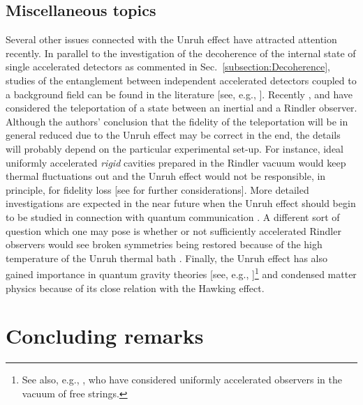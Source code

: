 \documentclass[12pt,nofootinbib,floatfix,aps,prd,showpacs,amsmath,amssymb,eqsecnum]{revtex4-2}
\let\cite\citep
\begin{document}
\subsection{Miscellaneous topics}
\label{subsection:Miscellaneous}

Several other issues connected with the Unruh effect have attracted 
attention recently. In parallel to the investigation of the 
decoherence of the internal state of single accelerated detectors 
as commented in Sec.~\ref{subsection:Decoherence}, studies of the 
entanglement between independent accelerated detectors coupled 
to a background field can  be found in the literature 
[see, e.g., \textcite{Pringle89,Benattital04,Rezniktal05, Massaretal06}]. 
Recently \textcite{Alsingetal03}, 
\textcite{Alsingetal04} and \textcite{Alsingetal06} 
have considered the teleportation of a state between an inertial and a 
Rindler observer. 
Although the authors' conclusion that the fidelity of the 
teleportation will be in general reduced due to the Unruh effect 
may be correct in the end, 
the details will probably depend 
on the particular experimental set-up. For instance, ideal uniformly 
accelerated {\em rigid} cavities prepared in the Rindler vacuum  would keep 
thermal fluctuations out \cite{Levinetal92} and the Unruh effect 
would not be responsible, in principle, for fidelity loss 
[see \textcite{Schutzholdetal05} for further considerations]. 
More detailed investigations are expected in the near future when
the Unruh effect should begin to be studied in connection with 
quantum communication \cite{Bradler07}. A different sort of question 
which one may pose is whether or not sufficiently accelerated Rindler 
observers would see broken symmetries being restored because of the 
high temperature of the Unruh thermal bath \cite{Hill85,Ohsaku04,Ebertetal07,Kharzeevetal05}. 
Finally, the Unruh effect has also gained importance in
quantum gravity theories [see, e.g., 
\textcite{Susskindetal94}]\footnote{See also, e.g., 
\textcite{Parentanietal89}, who have considered uniformly 
accelerated observers in the vacuum of free strings.}
and condensed matter physics \cite{Unruh81} because of 
its close relation with the Hawking effect.

\section{Concluding remarks}
\label{section:Summary}
\end{document}

